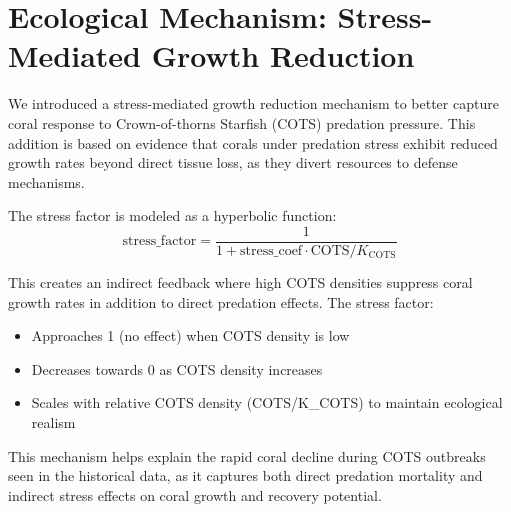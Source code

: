 \section{Ecological Mechanism: Stress-Mediated Growth Reduction}

We introduced a stress-mediated growth reduction mechanism to better capture coral response to Crown-of-thorns Starfish (COTS) predation pressure. This addition is based on evidence that corals under predation stress exhibit reduced growth rates beyond direct tissue loss, as they divert resources to defense mechanisms.

The stress factor is modeled as a hyperbolic function:
\[ \text{stress\_factor} = \frac{1}{1 + \text{stress\_coef} \cdot \text{COTS}/K_\text{COTS}} \]

This creates an indirect feedback where high COTS densities suppress coral growth rates in addition to direct predation effects. The stress factor:
\begin{itemize}
    \item Approaches 1 (no effect) when COTS density is low
    \item Decreases towards 0 as COTS density increases
    \item Scales with relative COTS density (COTS/K\_COTS) to maintain ecological realism
\end{itemize}

This mechanism helps explain the rapid coral decline during COTS outbreaks seen in the historical data, as it captures both direct predation mortality and indirect stress effects on coral growth and recovery potential.
